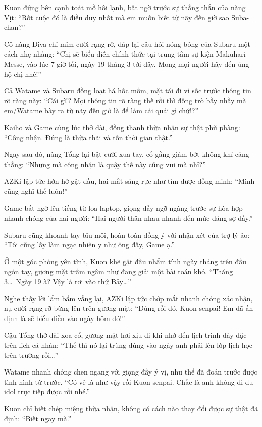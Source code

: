 \documentclass[../main.tex]{subfiles}
\begin{document}
Kuon đứng bên cạnh toát mồ hôi lạnh, bất ngờ trước sự thẳng thắn của nàng Vịt: ``Rốt cuộc đó là điều duy nhất mà em muốn biết từ nãy đến giờ sao Suba-chan?''

Cô nàng Diva chỉ mỉm cười rạng rỡ, đáp lại câu hỏi nóng bỏng của Subaru một cách nhẹ nhàng: ``Chị sẽ biểu diễn chính thức tại trung tâm sự kiện Makuhari Messe, vào lúc 7 giờ tối, ngày 19 tháng 3 tới đây. Mong mọi người hãy đến ủng hộ chị nhé!''

Cả Watame và Subaru đồng loạt há hốc mồm, mặt tái đi vì sốc trước thông tin rõ ràng này: ``Cái gì!? Mọi thông tin rõ ràng thế rồi thì đống trò bầy nhầy mà em/Watame bày ra từ nãy đến giờ là để làm cái quái gì chứ!?''

Kaiho và Game cùng lúc thở dài, đồng thanh thừa nhận sự thật phũ phàng: ``Công nhận. Đúng là thừa thãi và tốn thời gian thật.''

Ngay sau đó, nàng Tổng lại bật cười xua tay, cố gắng giảm bớt không khí căng thẳng: ``Nhưng mà công nhận là quậy thế này cũng vui mà nhỉ?''

AZKi lập tức hớn hở gật đầu, hai mắt sáng rực như tìm được đồng minh: ``Mình cũng nghĩ thế luôn!''

Game bất ngờ lên tiếng từ loa laptop, giọng đầy ngỡ ngàng trước sự hòa hợp nhanh chóng của hai người: ``Hai người thân nhau nhanh đến mức đáng sợ đấy.''

Subaru cũng khoanh tay bĩu môi, hoàn toàn đồng ý với nhận xét của trợ lý ảo: ``Tôi cũng lấy làm ngạc nhiên y như ông đấy, Game ạ.''

Ở một góc phòng yên tĩnh, Kuon khẽ gật đầu nhẩm tính ngày tháng trên đầu ngón tay, gương mặt trầm ngâm như đang giải một bài toán khó. ``Tháng 3\dots\ Ngày 19 à? Vậy là rơi vào thứ Bảy\dots''

Nghe thấy lời lẩm bẩm vẳng lại, AZKi lập tức chớp mắt nhanh chóng xác nhận, nụ cười rạng rỡ bừng lên trên gương mặt: ``Đúng rồi đó, Kuon-senpai! Em đã ấn định là sẽ biểu diễn vào ngày hôm đó!''

Cậu Tổng thở dài xoa cổ, gương mặt hơi xịu đi khi nhớ đến lịch trình dày đặc trên lịch cá nhân: ``Thế thì nó lại trùng đúng vào ngày anh phải lên lớp lịch học trên trường rồi\dots''

Watame nhanh chóng chen ngang với giọng đầy ý vị, như thể đã đoán trước được tình hình từ trước. ``Có vẻ là như vậy rồi Kuon-senpai. Chắc là anh không đi đu idol trực tiếp được rồi nhé.''

Kuon chỉ biết chép miệng thừa nhận, không có cách nào thay đổi được sự thật đã định: ``Biết ngay mà.''
\end{document}
